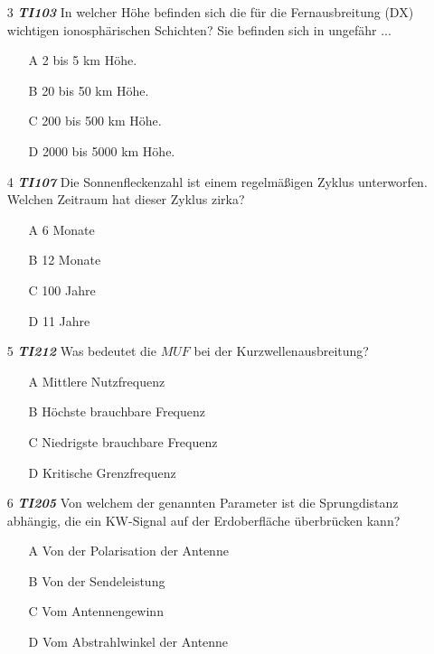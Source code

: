 \begin{enumerate} 
\itemsep1pt\parskip0pt
\item[3] \emph{\textbf{TI103}}  In welcher Höhe befinden sich die für die Fernausbreitung (DX) wichtigen ionosphärischen Schichten? Sie befinden sich in ungefähr ...
	\begin{enumerate}
	\itemsep1pt\parskip0pt
		\item[A] 2 bis 5 km Höhe.
		\item[B] 20 bis 50 km Höhe.
		\item[C] 200 bis 500 km Höhe.
		\item[D] 2000 bis 5000 km Höhe.
	\end{enumerate}
\end{enumerate}


\begin{enumerate} 
\itemsep1pt\parskip0pt
\item[4] \emph{\textbf{TI107}}  Die Sonnenfleckenzahl ist einem regelmäßigen Zyklus unterworfen. Welchen Zeitraum hat dieser Zyklus zirka?
	\begin{enumerate}
	\itemsep1pt\parskip0pt
		\item[A] 6 Monate
		\item[B] 12 Monate
		\item[C] 100 Jahre
		\item[D] 11 Jahre
	\end{enumerate}
\end{enumerate}



\begin{enumerate} 
\itemsep1pt\parskip0pt
\item[5] \emph{\textbf{TI212}}   Was bedeutet die $MUF$ bei der Kurzwellenausbreitung?
	\begin{enumerate}
	\itemsep1pt\parskip0pt
		\item[A] Mittlere Nutzfrequenz
		\item[B] Höchste brauchbare Frequenz
		\item[C] Niedrigste brauchbare Frequenz
		\item[D] Kritische Grenzfrequenz
	\end{enumerate}
\end{enumerate}

\begin{enumerate} 
\itemsep1pt\parskip0pt
\item[6] \emph{\textbf{TI205}}   Von welchem der genannten Parameter ist die Sprungdistanz abhängig, die ein KW-Signal auf der Erdoberfläche überbrücken kann?
	\begin{enumerate}
	\itemsep1pt\parskip0pt
		\item[A] Von der Polarisation der Antenne
		\item[B] Von der Sendeleistung
		\item[C] Vom Antennengewinn
		\item[D] Vom Abstrahlwinkel der Antenne
	\end{enumerate}
\end{enumerate}


